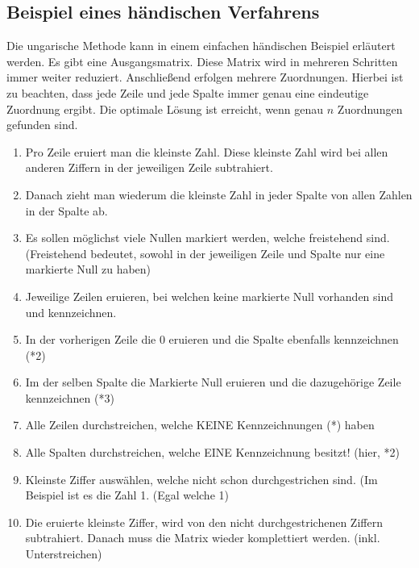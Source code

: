\subsection{Beispiel eines händischen Verfahrens
\label{munkres:subsection:malorum}}

Die ungarische Methode kann in einem einfachen händischen Beispiel
erläutert werden. Es gibt eine Ausgangsmatrix. Diese Matrix wird in mehreren Schritten immer
weiter reduziert. Anschließend erfolgen mehrere Zuordnungen. Hierbei ist zu beachten, dass
jede Zeile und jede Spalte immer genau eine eindeutige Zuordnung ergibt.
Die optimale Lösung ist erreicht, wenn genau $n$ Zuordnungen gefunden
sind.

\begin{enumerate}
\item Pro Zeile eruiert man die kleinste Zahl. Diese kleinste Zahl wird bei
allen anderen Ziffern in der jeweiligen Zeile subtrahiert.

\item Danach zieht man wiederum die kleinste Zahl in jeder Spalte von allen
Zahlen in der Spalte ab.

\item Es sollen möglichst viele Nullen markiert werden, welche freistehend sind.
(Freistehend bedeutet, sowohl in der jeweiligen Zeile und Spalte nur
eine markierte Null zu haben)

\item Jeweilige Zeilen eruieren, bei welchen keine markierte Null vorhanden sind und kennzeichnen.

\item In der vorherigen Zeile die 0 eruieren und die Spalte ebenfalls
kennzeichnen (*2)

\item Im der selben Spalte die Markierte Null eruieren und die dazugehörige
Zeile kennzeichnen (*3)

\item Alle Zeilen durchstreichen, welche KEINE Kennzeichnungen (*) haben

\item Alle Spalten durchstreichen, welche EINE Kennzeichnung besitzt! (hier, *2)

\item Kleinste Ziffer auswählen, welche nicht schon durchgestrichen sind.
(Im Beispiel ist es die Zahl 1. (Egal welche 1)

\item Die eruierte kleinste Ziffer, wird von den nicht durchgestrichenen Ziffern
subtrahiert. Danach muss die Matrix wieder komplettiert werden. (inkl. Unterstreichen)


\end{enumerate}
